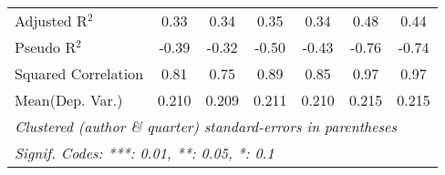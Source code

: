 \begin{tabular}{lcccccc}
   Adjusted R$^2$                                             & 0.33           & 0.34           & 0.35         & 0.34      & 0.48    & 0.44\\  
   Pseudo R$^2$                                               & -0.39          & -0.32          & -0.50        & -0.43     & -0.76   & -0.74\\  
   Squared Correlation                                        & 0.81           & 0.75           & 0.89         & 0.85      & 0.97    & 0.97\\  
Mean(Dep. Var.) & 0.210 & 0.209 & 0.211 & 0.210 & 0.215 & 0.215 \\
   \midrule \midrule
   \multicolumn{7}{l}{\emph{Clustered (author \& quarter) standard-errors in parentheses}}\\
   \multicolumn{7}{l}{\emph{Signif. Codes: ***: 0.01, **: 0.05, *: 0.1}}\\
\end{tabular}
\par\endgroup
